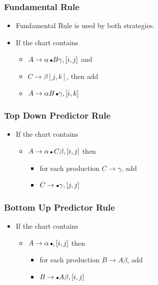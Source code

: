 \begin{frame}[fragile]
 \frametitle{Fundamental Rule}

 \begin{itemize}
 \item Fundamental Rule is used by both strategies.
 \item If the chart contains
   \begin{itemize}
   \item $A \rightarrow \alpha \, \bigdot B \gamma, [i,j]$
 and
\item $C \rightarrow \beta [j,k]$, then add  

\item $A \rightarrow \alpha  B \, \bigdot \gamma, [i,k]$
   \end{itemize}
 

 \end{itemize}
\end{frame}

\begin{frame}[fragile]
 \frametitle{Top Down Predictor Rule}

 \begin{itemize}
 \item If the chart contains
   \begin{itemize}
   \item $A \rightarrow \alpha \, \bigdot  \, C \beta, [i,j]$
     then
      \begin{itemize}
      \item for each production $C \rightarrow \gamma$,  add  
      \item $C \rightarrow  \bigdot \gamma, [j,j]$
      \end{itemize}
   \end{itemize}
 \end{itemize}

\end{frame}

\begin{frame}[fragile]
 \frametitle{Bottom Up Predictor Rule}

 \begin{itemize}
 \item If the chart contains
   \begin{itemize}
   \item $A \rightarrow \alpha \, \bigdot, [i,j]$
     then
      \begin{itemize}
      \item for each production $B \rightarrow A \beta$,  add  
      \item $B \rightarrow  \bigdot A  \beta, [i,j]$
      \end{itemize}
   \end{itemize}
 \end{itemize}

\end{frame}



